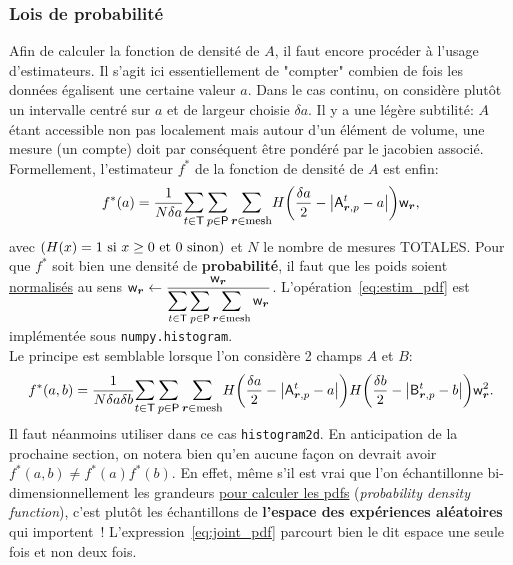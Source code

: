 \documentclass[13pt, a4paper]{extarticle}
\begin{document}
\subsubsection{Lois de probabilité}
\noindent Afin de calculer la fonction de densité de $A$, il faut encore procéder à
l'usage d'estimateurs. Il s'agit ici essentiellement de "compter" combien de fois
les données égalisent une certaine valeur $a$. Dans le cas continu,
on considère plutôt un intervalle centré sur $a$ et de largeur choisie $\delta a$. Il y a une
légère subtilité: $A$ étant accessible non pas localement mais autour d'un élément
de volume, une mesure (un compte) doit par conséquent être pondéré par le jacobien associé.
Formellement, l'estimateur $f^*$ de la fonction de densité de $A$ est enfin:
\begin{align}
    f^*(a) = \dfrac{1}{N\delta a}\mathlarger{\sum_{t\in\qop{T}}\sum_{p\in\qop{P}}
    \sum_{\git{r}\in\text{mesh}}}H\qty(\dfrac{\delta a}{2}-
    \big\vert\qop{A}_{\git{r},p}^t-a\big\vert)\qop{w}_{\git{r}},
    \label{eq:estim_pdf}
\end{align}
avec $\qty(H(x) = 1~\text{si}~x\geq 0~\text{et}~0~\text{sinon})$ et $N$ le nombre
de mesures TOTALES. Pour que $f^*$ soit bien une densité de {\bf probabilité}, il faut
que les poids soient \underline{normalisés} au sens $
\mathsf{w}_{\boldsymbol{r}}\leftarrow\displaystyle\dfrac{\mathsf{w}_{\boldsymbol{r}}}{
    \displaystyle\sum_{t\in\mathsf{T}}\sum_{p\in\mathsf{P}}\sum_{\boldsymbol{r}\in\text{mesh}}\mathsf{w}_{\boldsymbol{r}}}$.
L'opération~\eqref{eq:estim_pdf} est implémentée sous \texttt{numpy.histogram}.\\
Le principe est semblable lorsque l'on considère 2 champs $A$ et $B$:
\begin{align}
    f^*(a,b) = \dfrac{1}{N\delta a\delta b}\mathlarger{\sum_{t\in\qop{T}}\sum_{p\in\qop{P}}
    \sum_{\git{r}\in\text{mesh}}}H\qty(\dfrac{\delta a}{2}-
    \big\vert\qop{A}_{\git{r},p}^t-a\big\vert)
    H\qty(\dfrac{\delta b}{2}-
    \big\vert\qop{B}_{\git{r},p}^t-b\big\vert)\qop{w}_{\git{r}}^2.
    \label{eq:joint_pdf}
\end{align}
Il faut néanmoins utiliser dans ce cas \texttt{histogram2d}. En anticipation de la
prochaine section, on notera bien qu'en aucune façon on devrait avoir 
$f^*(a,b) \neq f^*(a)f^*(b)$. En effet, 
même s'il est vrai que l'on échantillonne bi-dimensionnellement les grandeurs 
\underline{pour calculer les pdfs} ({\it{probability density function}}), c'est plutôt les échantillons de 
{\bf l'espace des expériences aléatoires} qui importent~! L'expression~\eqref{eq:joint_pdf}
parcourt bien le dit espace une seule fois et non deux fois.\\
\end{document}
